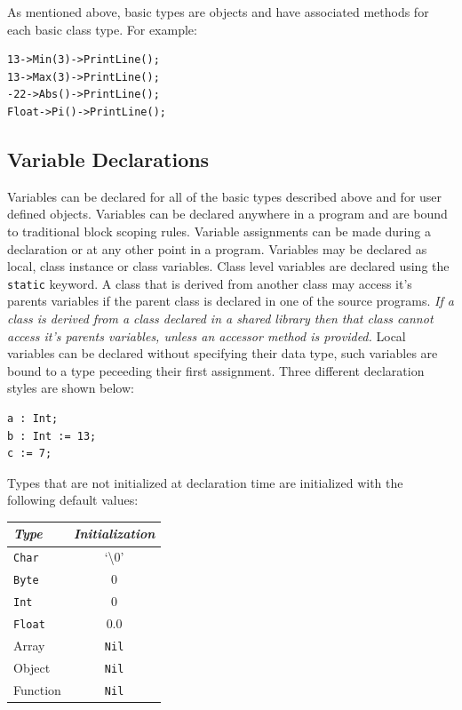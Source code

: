 \documentclass[12pt]{article}
\begin{document}
As mentioned above, basic types are objects and have associated methods for each basic class type.  For example:

\begin{verbatim}
13->Min(3)->PrintLine();
13->Max(3)->PrintLine();
-22->Abs()->PrintLine();
Float->Pi()->PrintLine();
\end{verbatim}

\subsection{Variable Declarations}
Variables can be declared for all of the basic types described above and for user defined objects. Variables can be declared anywhere in a program and are bound to traditional block scoping rules.  Variable assignments can be made during a declaration or at any other point in a program. Variables may be declared as local, class instance or class variables.  Class level variables are declared using the \texttt{static} keyword. A class that is derived from another class may access it's parents variables if the parent class is declared in one of the source programs.  \textit{If a class is derived from a class declared in a shared library then that class cannot access it's parents variables, unless an accessor method is provided.}  Local variables can be declared without specifying their data type, such variables are bound to a type peceeding their first assignment. Three different declaration styles are shown below:

\begin{verbatim}
a : Int;
b : Int := 13;
c := 7;
\end{verbatim}

Types that are not initialized at declaration time are initialized with the following default values:

\vspace{\baselineskip}
\begin{center}
\begin{tabular}{| l | c |}
\hline
\emph{Type} & \emph{Initialization} \\ \hline \hline
\texttt{Char} & `\textbackslash0' \\ \hline
\texttt{Byte} & 0 \\ \hline
\texttt{Int} & 0 \\ \hline
\texttt{Float} & 0.0 \\ \hline
Array & \texttt{Nil} \\ \hline
Object & \texttt{Nil} \\ \hline
Function & \texttt{Nil} \\ \hline
\end{tabular}
\end{center}
\end{document}

